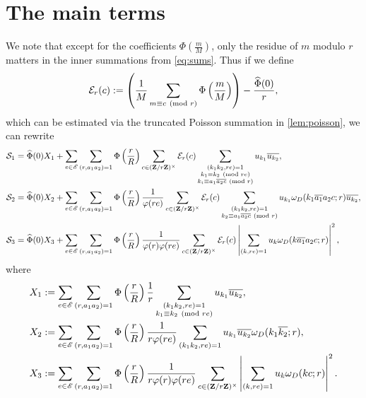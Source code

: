 \documentclass[reqno,11pt]{amsart}
\theoremstyle{definition}
\theoremstyle{remark}
\numberwithin{equation}{section}
\newcommand{\Z}{\mathbf{Z}}
\newcommand{\msE}{\mathscr{E}}
\newcommand{\mE}{\mathcal{E}}
\newcommand{\mS}{\mathcal{S}}
\renewcommand{\bar}{\overline}
\renewcommand{\hat}{\widehat}
\renewcommand{\pmod}[1]{\ (\textnormal{mod } #1)}
\begin{document}
\section{The main terms}
We note that except for the coefficients $\Phi\left(\frac{m}{M}\right)$, only the residue of $m$ modulo $r$ matters in the inner summations from \cref{eq:sums}. Thus if we define
\begin{equation} \label{eq:Poisson-difference}
    \mE_r(c) := \left(\frac{1}{M} \sum_{m \equiv c \pmod{r}} \Phi\left(\frac{m}{M}\right) \right) - \frac{\hat{\Phi}(0)}{r},
\end{equation}
which can be estimated via the truncated Poisson summation in \cref{lem:poisson}, we can rewrite
\begin{equation} \label{eq:sums-2}
\begin{aligned}
    \mS_1 &= \hat{\Phi}(0) X_1 + \sum_{e \in \msE} \sum_{(r,a_1a_2)=1} \Phi\left(\frac{r}{R}\right) \sum_{c \in (\Z/r\Z)^\times} \mE_r(c) \sum_{\substack{(k_1k_2,re)=1 \\ k_1 \equiv k_2 \pmod{re} \\ k_i \equiv a_1\bar{a_2c} \pmod{r}}} u_{k_1} \bar{u_{k_2}},
    \\
    \mS_2 &= \hat{\Phi}(0) X_2 + \sum_{e \in \msE} \sum_{(r,a_1a_2)=1} \Phi\left(\frac{r}{R}\right) \frac{1}{\varphi(re)}  \sum_{c \in (\Z/r\Z)^\times} \mE_r(c) \sum_{\substack{(k_1k_2,re)=1 \\ k_2 \equiv a_1\bar{a_2c} \pmod{r}}} u_{k_1} \omega_D(k_1 \bar{a_1}a_2c; r)\bar{u_{k_2}},
    \\
    \mS_3 &= \hat{\Phi}(0) X_3 + \sum_{e \in \msE} \sum_{(r,a_1a_2)=1} \Phi\left(\frac{r}{R}\right) \frac{1}{\varphi(r)\varphi(re)}  \sum_{c \in (\Z/r\Z)^\times} \mE_r(c) \left\vert \sum_{(k,re)=1} u_k \omega_D(k \bar{a_1}a_2c; r)\right\vert^2,
\end{aligned}
\end{equation}
where
\begin{equation} \label{eq:main-terms}
\begin{aligned}
    X_1 &:= \sum_{e \in \msE} \sum_{(r,a_1a_2)=1} \Phi\left(\frac{r}{R}\right) \frac{1}{r} \sum_{\substack{(k_1k_2,re)=1 \\ k_1 \equiv k_2 \pmod{re}}} u_{k_1} \bar{u_{k_2}},
    \\
    X_2 &:= \sum_{e \in \msE} \sum_{(r,a_1a_2)=1} \Phi\left(\frac{r}{R}\right)  \frac{1}{r\varphi(re)} \sum_{\substack{(k_1k_2,re)=1}} u_{k_1} \bar{u_{k_2}} \omega_D(k_1 \bar{k_2}; r),
    \\
    X_3 &:= \sum_{e \in \msE} \sum_{(r,a_1a_2)=1} \Phi\left(\frac{r}{R}\right) \frac{1}{r\varphi(r)\varphi(re)}  \sum_{c \in (\Z/r\Z)^\times} \left\vert \sum_{(k,re)=1} u_k \omega_D(kc; r)\right\vert^2.
\end{aligned}
\end{equation}
\end{document}
